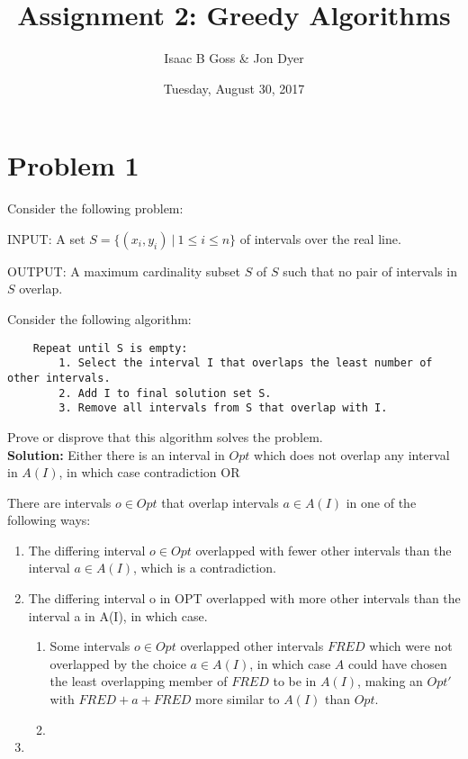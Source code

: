 \documentclass{article}
\author{Isaac B Goss \& Jon Dyer}
\title{Assignment 2: Greedy Algorithms}
\date{Tuesday, August 30, 2017}
\providecommand{\soln}{\textbf{Solution: }}
\begin{document}
\maketitle

    \section*{Problem 1}
    Consider the following problem:
    
    INPUT: A set $S = \{(x_i, y_i)\ |\ 1 \leq i \leq n\}$ of intervals over the real line.
    
    OUTPUT: A maximum cardinality subset $S$ of $S$ such that no pair of intervals in $S$ overlap.
        
    Consider the following algorithm:
    
    \begin{lstlisting}
    Repeat until S is empty:
        1. Select the interval I that overlaps the least number of other intervals.
        2. Add I to final solution set S.
        3. Remove all intervals from S that overlap with I.
    \end{lstlisting}

    Prove or disprove that this algorithm solves the problem.\\
    
    \soln Either there is an interval in $Opt$ which does not overlap any interval in $A(I)$, in which case contradiction OR

    There are intervals $o \in Opt$ that overlap intervals $a \in A(I)$ in one of the following ways:
    
    \begin{enumerate}
        \item The differing interval $o \in Opt$ overlapped with fewer other intervals than the interval $a \in A(I)$, which is a contradiction.
        \item The differing interval o in OPT overlapped with more other intervals than the interval a in A(I), in which case.
        \begin{enumerate}
            \item Some intervals $o \in Opt$ overlapped other intervals $FRED$ which were not overlapped by the choice $a \in A(I)$, in which case $A$ could have chosen the least overlapping member of $FRED$ to be in $A(I)$, making an $Opt'$ with $FRED + a + FRED$ more similar to $A(I)$ than $Opt$.
            \item
        \end{enumerate}
        \item
    \end{enumerate}
    
\end{document}
